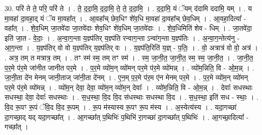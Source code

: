\documentclass[17pt]{extarticle}
\begin{document}
30. परि॑ ते ते॒ परि॒ परि॑ ते । . ते॒ द॒दा॒मि॒ द॒दा॒मि॒ ते॒ ते॒ द॒दा॒मि॒ । . द॒दा॒मि॒ यं ॅयम् द॑दामि ददामि॒ यम् । . य मा॒वहा॑ दा॒वहा॒द् यं ॅय मा॒वहा᳚त् । . आ॒वहा᳚च् छेव॒धिꣳ शे॑व॒धि मा॒वहा॑ दा॒वहा᳚च् छेव॒धिम् । . आ॒वहा॒दित्या᳚ - वहा᳚त् । . शे॒व॒धिम् जा॒तवे॑दा जा॒तवे॑दाः शेव॒धिꣳ शे॑व॒धिम् जा॒तवे॑दाः । . शे॒व॒धिमिति॑ शेव - धिम् । . जा॒तवे॑दा॒ इति॑ जा॒त - वे॒दाः॒ । . अ॒न्वा॒ग॒न्ता य॒ज्ञ्प॑तिर् य॒ज्ञ्प॑ति रन्वाग॒न्ता ऽन्वा॑ग॒न्ता य॒ज्ञ्प॑तिः । . अ॒न्वा॒ग॒न्तेत्य॑नु - आ॒ग॒न्ता । . य॒ज्ञ्प॑तिर् वो वो य॒ज्ञ्प॑तिर् य॒ज्ञ्प॑तिर् वः । . य॒ज्ञ्प॑ति॒रिति॑ य॒ज्ञ् - प॒तिः॒ । . वो॒ अत्रात्र॑ वो वो॒ अत्र॑ । . अत्र॒ तम् त मत्रात्र॒ तम् । . तꣳ स्म॑ स्म॒ तम् तꣳ स्म॑ । . स्म॒ जा॒नी॒त॒ जा॒नी॒त॒ स्म॒ स्म॒ जा॒नी॒त॒ । . जा॒नी॒त॒ प॒र॒मे प॑र॒मे जा॑नीत जानीत पर॒मे । . प॒र॒मे व्यो॑म॒न् व्यो॑मन् पर॒मे प॑र॒मे व्यो॑मन्न् । . व्यो॑म॒न्निति॒ वि - ओ॒म॒न्न् । . जा॒नी॒ता दे॑न मेनम् जानी॒ताज् जा॑नी॒ता दे॑नम् । . ए॒न॒म् प॒र॒मे प॑र॒म ए॑न मेनम् पर॒मे । . प॒र॒मे व्यो॑म॒न् व्यो॑मन् पर॒मे प॑र॒मे व्यो॑मन्न् । . व्यो॑म॒न् देवा॒ देवा॒ व्यो॑म॒न् व्यो॑म॒न् देवाः᳚ । . व्यो॑म॒न्निति॒ वि - ओ॒म॒न्न् । . देवाः᳚ सधस्थाः सधस्था॒ देवा॒ देवाः᳚ सधस्थाः । . स॒ध॒स्था॒ वि॒द वि॒द स॑धस्थाः सधस्था वि॒द । . स॒ध॒स्था॒ इति॑ सध - स्थाः॒ । . वि॒द रू॒पꣳ रू॒पं ॅवि॒द वि॒द रू॒पम् । . रू॒प म॑स्यास्य रू॒पꣳ रू॒प म॑स्य । . अ॒स्येत्य॑स्य । . यदा॒गच्छा॑ दा॒गच्छा॒द् यद् यदा॒गच्छा᳚त् । . आ॒गच्छा᳚त् प॒थिभिः॑ प॒थिभि॑ रा॒गच्छा॑ दा॒गच्छा᳚त् प॒थिभिः॑ । . आ॒गच्छा॒दित्या᳚ - गच्छा᳚त् । \newline
\end{document}
